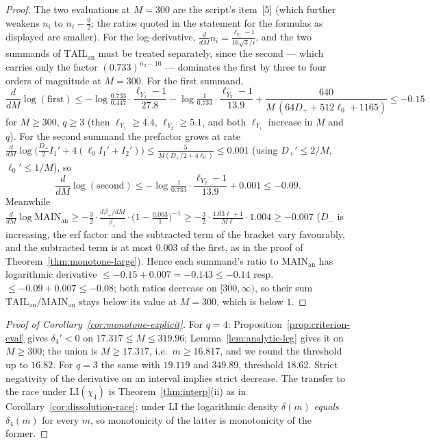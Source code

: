 \documentclass[11pt]{article}
\begin{document}
\begin{proof}
The two evaluations at $M=300$ are the script's item~[5] (which
further weakens $n_i$ to $n_i-\tfrac92$; the ratios quoted in the
statement for the formulas as displayed are smaller). For the
log-derivative, $\tfrac d{dM}n_i=\tfrac{\ell_{Y_i}-1}{16\sqrt3/i}$,
and the two summands of $\mathrm{TAIL}_{\mathrm{an}}$ must be treated
separately, since the second --- which carries only the factor
$(0.733)^{n_2-10}$ --- dominates the first by three to four orders of
magnitude at $M=300$. For the first summand,
\[
\frac d{dM}\log(\text{first})
\le-\log\tfrac{0.733}{0.447}\cdot\frac{\ell_{Y_1}-1}{27.8}
-\log\tfrac1{0.733}\cdot\frac{\ell_{Y_2}-1}{13.9}
+\frac{640}{M\,(64D_++512\ell_0+1165)}
\le-0.15
\]
for $M\ge300$, $q\ge3$ (then $\ell_{Y_1}\ge4.4$,
$\ell_{Y_2}\ge5.1$, and both $\ell_{Y_i}$ increase in $M$ and $q$).
For the second summand the prefactor grows at rate
$\tfrac d{dM}\log\bigl(\tfrac{D_+}2I_1'+4(\ell_0I_1'+I_2')\bigr)
\le\tfrac{5}{M(D_+/2+4\ell_0)}\le0.001$
(using $D_+'\le2/M$, $\ell_0'\le1/M$), so
\[
\frac d{dM}\log(\text{second})
\le-\log\tfrac1{0.733}\cdot\frac{\ell_{Y_2}-1}{13.9}+0.001
\le-0.09 .
\]
Meanwhile
$\frac d{dM}\log\mathrm{MAIN}_{\mathrm{an}}
\ge-\tfrac32\cdot\tfrac{d\beta_+/dM}{\beta_+}
\cdot\bigl(1-\tfrac{0.003}{1}\bigr)^{-1}
\ge-\tfrac32\cdot\tfrac{1.03\ell+1}{M\ell}\cdot1.004\ge-0.007$
($D_-$ is increasing, the erf factor and the subtracted term of the
bracket vary favourably, and the subtracted term is at most $0.003$
of the first, as in the proof of
Theorem~\ref{thm:monotone-large}). Hence each summand's ratio to
$\mathrm{MAIN}_{\mathrm{an}}$ has logarithmic derivative
$\le-0.15+0.007=-0.143\le-0.14$ resp.\
$\le-0.09+0.007\le-0.08$; both ratios decrease on $[300,\infty)$,
so their sum $\mathrm{TAIL}_{\mathrm{an}}/\mathrm{MAIN}_{\mathrm{an}}$
stays below its value at $M=300$, which is below $1$.
\end{proof}

\begin{proof}[Proof of Corollary~\ref{cor:monotone-explicit}]
For $q=4$: Proposition~\ref{prop:criterion-eval} gives
$\delta_4'<0$ on $17.317\le M\le319.96$;
Lemma~\ref{lem:analytic-leg} gives it on $M\ge300$; the union is
$M\ge17.317$, i.e.\ $m\ge16.817$, and we round the threshold up to
$16.82$. For $q=3$ the same with $19.119$ and $349.89$, threshold
$18.62$. Strict negativity of the derivative on an interval implies
strict decrease. The transfer to the race under LI$(\chi_4)$ is
Theorem~\ref{thm:interp}(ii) as in
Corollary~\ref{cor:dissolution-race}: under LI the logarithmic
density $\delta(m)$ \emph{equals} $\delta_4(m)$ for every $m$, so
monotonicity of the latter is monotonicity of the former.
\end{proof}
\end{document}
